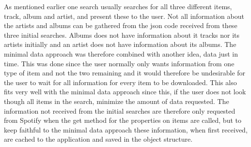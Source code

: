 As mentioned earlier one search usually searches for all three different items, track, album and artist, and present these to the user. Not all information about the artists and albums can be gathered from the json code received from these three initial searches. Albums does not have information about it tracks nor its artists initially and an artist does not have information about its albums. The minimal data approach was therefore combined with another idea, data just in time. This was done since the user normally only wants information from one type of item and not the two remaining and it would therefore be undesirable for the user to wait for all information for every item to be downloaded. This also fits very well with the minimal data approach since this, if the user does not look though all items in the search, minimize the amount of data requested. The information not received from the initial searches are therefore only requested from Spotify when the get method for the properties on items are called, but to keep faithful to the minimal data approach these information, when first received, are cached to the application and saved in the object structure.